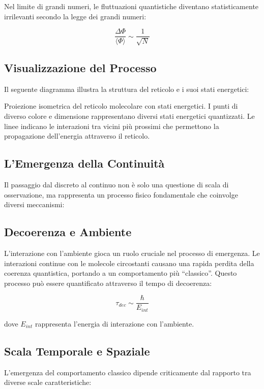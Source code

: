 \documentclass{gs-adonis}
\begin{document}
Nel limite di grandi numeri, le fluttuazioni quantistiche diventano
statisticamente irrilevanti secondo la legge dei grandi numeri:

\[\frac{\Delta \Phi}{\langle \Phi \rangle} \sim \frac{1}{\sqrt{N}}\]

\subsection{Visualizzazione del
Processo}\label{visualizzazione-del-processo}

Il seguente diagramma illustra la struttura del reticolo e i suoi stati
energetici:

Proiezione isometrica del reticolo molecolare con stati energetici. I
punti di diverso colore e dimensione rappresentano diversi stati
energetici quantizzati. Le linee indicano le interazioni tra vicini più
prossimi che permettono la propagazione dell'energia attraverso il
reticolo.

\subsection{L'Emergenza della
Continuità}\label{lemergenza-della-continuituxe0}

Il passaggio dal discreto al continuo non è solo una questione di scala
di osservazione, ma rappresenta un processo fisico fondamentale che
coinvolge diversi meccanismi:

\subsection{Decoerenza e Ambiente}\label{decoerenza-e-ambiente}

L'interazione con l'ambiente gioca un ruolo cruciale nel processo di
emergenza. Le interazioni continue con le molecole circostanti causano
una rapida perdita della coerenza quantistica, portando a un
comportamento più ``classico''. Questo processo può essere quantificato
attraverso il tempo di decoerenza:

\[\tau_{dec} \sim \frac{\hbar}{E_{int}}\]

dove \(E_{int}\) rappresenta l'energia di interazione con l'ambiente.

\subsection{Scala Temporale e
Spaziale}\label{scala-temporale-e-spaziale}

L'emergenza del comportamento classico dipende criticamente dal rapporto
tra diverse scale caratteristiche:
\end{document}
